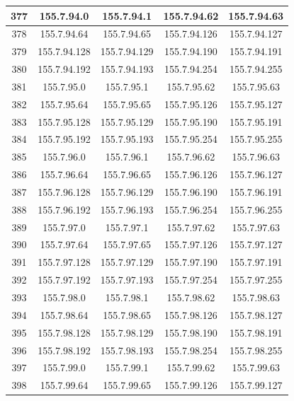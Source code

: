 \documentclass[letterpaper,12pt]{article}
\begin{document}
\begin{longtable}{|c|c|c|c|c|}
        377 & 155.7.94.0 & 155.7.94.1 & 155.7.94.62 & 155.7.94.63 \\ \hline
        378 & 155.7.94.64 & 155.7.94.65 & 155.7.94.126 & 155.7.94.127 \\ \hline
        379 & 155.7.94.128 & 155.7.94.129 & 155.7.94.190 & 155.7.94.191 \\ \hline
        380 & 155.7.94.192 & 155.7.94.193 & 155.7.94.254 & 155.7.94.255 \\ \hline
        381 & 155.7.95.0 & 155.7.95.1 & 155.7.95.62 & 155.7.95.63 \\ \hline
        382 & 155.7.95.64 & 155.7.95.65 & 155.7.95.126 & 155.7.95.127 \\ \hline
        383 & 155.7.95.128 & 155.7.95.129 & 155.7.95.190 & 155.7.95.191 \\ \hline
        384 & 155.7.95.192 & 155.7.95.193 & 155.7.95.254 & 155.7.95.255 \\ \hline
        385 & 155.7.96.0 & 155.7.96.1 & 155.7.96.62 & 155.7.96.63 \\ \hline
        386 & 155.7.96.64 & 155.7.96.65 & 155.7.96.126 & 155.7.96.127 \\ \hline
        387 & 155.7.96.128 & 155.7.96.129 & 155.7.96.190 & 155.7.96.191 \\ \hline
        388 & 155.7.96.192 & 155.7.96.193 & 155.7.96.254 & 155.7.96.255 \\ \hline
        389 & 155.7.97.0 & 155.7.97.1 & 155.7.97.62 & 155.7.97.63 \\ \hline
        390 & 155.7.97.64 & 155.7.97.65 & 155.7.97.126 & 155.7.97.127 \\ \hline
        391 & 155.7.97.128 & 155.7.97.129 & 155.7.97.190 & 155.7.97.191 \\ \hline
        392 & 155.7.97.192 & 155.7.97.193 & 155.7.97.254 & 155.7.97.255 \\ \hline
        393 & 155.7.98.0 & 155.7.98.1 & 155.7.98.62 & 155.7.98.63 \\ \hline
        394 & 155.7.98.64 & 155.7.98.65 & 155.7.98.126 & 155.7.98.127 \\ \hline
        395 & 155.7.98.128 & 155.7.98.129 & 155.7.98.190 & 155.7.98.191 \\ \hline
        396 & 155.7.98.192 & 155.7.98.193 & 155.7.98.254 & 155.7.98.255 \\ \hline
        397 & 155.7.99.0 & 155.7.99.1 & 155.7.99.62 & 155.7.99.63 \\ \hline
        398 & 155.7.99.64 & 155.7.99.65 & 155.7.99.126 & 155.7.99.127 \\ \hline

\end{longtable}
\end{document}
